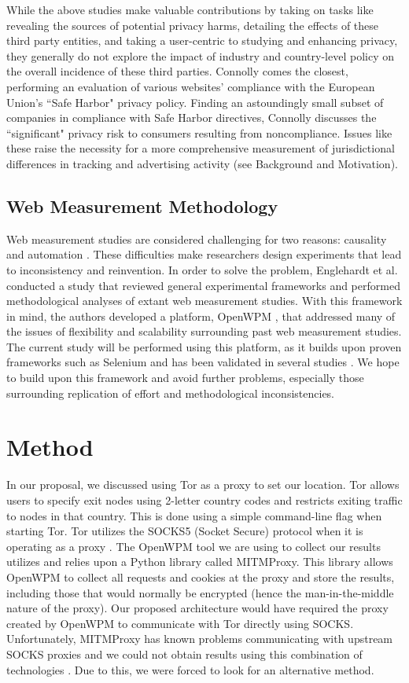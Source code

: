 \documentclass[12pt,draft,onecolumn]{IEEEtran}
\begin{document}
While the above studies make valuable contributions by taking on tasks like revealing the sources of potential privacy harms, detailing the effects of these third party entities, and taking a user-centric to studying and enhancing privacy, they generally do not explore the impact of industry and country-level policy on the overall incidence of these third parties. Connolly \cite{connolly} comes the closest, performing an evaluation of various websites' compliance with the European Union's ``Safe Harbor" privacy policy. Finding an astoundingly small subset of companies in compliance with Safe Harbor directives, Connolly discusses the ``significant" privacy risk to consumers resulting from noncompliance.  Issues like these raise the necessity for a more comprehensive measurement of jurisdictional differences in tracking and advertising activity (see Background and Motivation).

\subsection{Web Measurement Methodology}
Web measurement studies are considered challenging for two reasons: causality and automation \cite{openwpm_article}. These difficulties make researchers design experiments that lead to inconsistency and reinvention. In order to solve the problem, Englehardt et al. conducted a study that reviewed general experimental frameworks and performed methodological analyses of extant web measurement studies. With this framework in mind, the authors developed a platform, OpenWPM \cite{openwpm}, that addressed many of the issues of flexibility and scalability surrounding past web measurement studies. The current study will be performed using this platform, as it builds upon proven frameworks such as Selenium \cite{Selenium} and has been validated in several studies \cite{openwpm}\cite{openwpm_article}. We hope to build upon this framework and avoid further problems, especially those surrounding replication of effort and methodological inconsistencies.

\section{Method}
In our proposal, we discussed using Tor as a proxy to set our location. Tor allows users to specify exit nodes using 2-letter country codes and restricts exiting traffic to nodes in that country. This is done using a simple command-line flag when starting Tor. Tor utilizes the SOCKS5 (Socket Secure) protocol when it is operating as a proxy \cite{torsocks5}. The OpenWPM tool we are using to collect our results utilizes and relies upon a Python library called MITMProxy. This library allows OpenWPM to collect all requests and cookies at the proxy and store the results, including those that would normally be encrypted (hence the man-in-the-middle nature of the proxy). Our proposed architecture would have required the proxy created by OpenWPM to communicate with Tor directly using SOCKS. Unfortunately, MITMProxy has known problems communicating with upstream SOCKS proxies and we could not obtain results using this combination of technologies \cite{MITM}. Due to this, we were forced to look for an alternative method.
\end{document}
